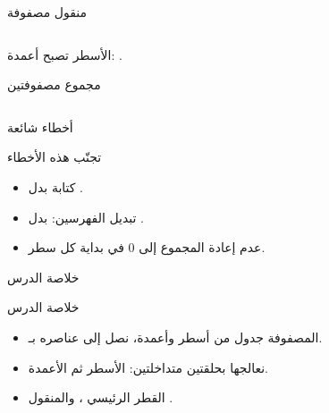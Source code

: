 \documentclass[aspectratio=169, 11pt, t, xcolor={table}]{beamer}
\begin{document}
\begin{frame}{منقول مصفوفة}
    \begin{columns}[T]
    \end{columns}
    \vspace{0.2cm}
    الأسطر تصبح أعمدة: .
\end{frame}

\begin{frame}{مجموع مصفوفتين}
    \begin{columns}[T]
    \end{columns}
\end{frame}



\begin{frame}{أخطاء شائعة}
    \begin{obox}{\faExclamationTriangle\quad تجنّب هذه الأخطاء}
        \begin{itemize}
            \item كتابة  بدل .
            \item تبديل الفهرسين:  بدل .
            \item عدم إعادة المجموع إلى \textenglish{0} في بداية كل سطر.
        \end{itemize}
    \end{obox}
\end{frame}

\begin{frame}{خلاصة الدرس}
    \begin{tbox}{\faCheckCircle\quad خلاصة الدرس}
        \begin{itemize}
            \item المصفوفة جدول من أسطر وأعمدة، نصل إلى عناصره بـ.
            \item نعالجها بحلقتين متداخلتين: الأسطر ثم الأعمدة.
            \item القطر الرئيسي ، والمنقول .
        \end{itemize}
    \end{tbox}
\end{frame}
\end{document}
